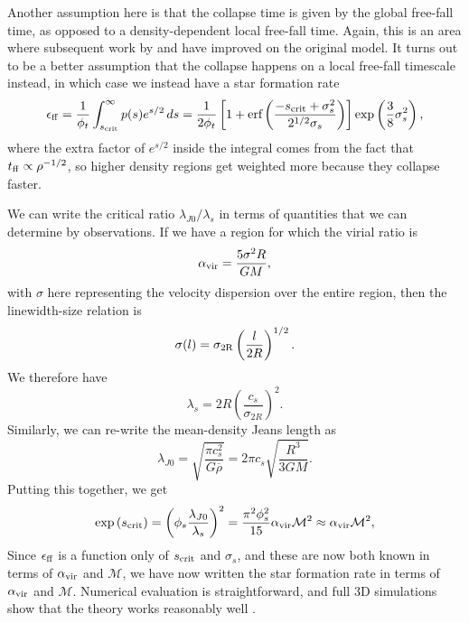 Another assumption here is that the collapse time is given by the global free-fall time, as opposed to a density-dependent local free-fall time. Again, this is an area where subsequent work by \citet{hennebelle11b} and \citet{federrath12a} have improved on the original model. It turns out to be a better assumption that the collapse happens on a local free-fall timescale instead, in which case we instead have a star formation rate
\begin{equation}
\epsilon_{\rm ff} = \frac{1}{\phi_t} \int_{s_{\rm crit}}^\infty p(s) e^{s/2} \, ds
= \frac{1}{2\phi_t} \left[1+\mbox{erf}\left(\frac{-s_{\rm crit}+\sigma_s^2}{2^{1/2}\sigma_s}\right)\right] \exp\left(\frac{3}{8}\sigma_s^2\right),
\end{equation}
where the extra factor of $e^{s/2}$ inside the integral comes from the fact that $t_{\rm ff} \propto \rho^{-1/2}$, so higher density regions get weighted more because they collapse faster.

We can write the critical ratio $\lambda_{J0}/\lambda_s$ in terms of quantities that we can determine by observations. If we have a region for which the virial ratio is
\begin{equation}
\alpha_{\mathrm{vir}} = \frac{5\sigma^2 R}{GM},
\end{equation}
with $\sigma$ here representing the velocity dispersion over the entire region, then the linewidth-size relation is
\begin{equation}
\sigma(l) = \sigma_{\rm 2R} \left(\frac{l}{2R}\right)^{1/2}.
\end{equation}
We therefore have
\begin{equation}
\lambda_s = 2R \left(\frac{c_s}{\sigma_{2R}}\right)^2.
\end{equation}
Similarly, we can re-write the mean-density Jeans length as
\begin{equation}
\lambda_{J0} = \sqrt{\frac{\pi c_s^2}{G\overline{\rho}}} = 2\pi c_s \sqrt{\frac{R^3}{3 GM}}.
\end{equation}
Putting this together, we get
\begin{equation}
\exp\left(s_{\rm crit}\right) = \left(\phi_s \frac{\lambda_{J0}}{\lambda_s}\right)^2 = \frac{\pi^2 \phi_s^2}{15} \alpha_{\mathrm{vir}} \mathcal{M}^2 \approx \alpha_{\mathrm{vir}} \mathcal{M}^2,
\end{equation}
Since $\epsilon_{\rm ff}$ is a function only of $s_{\rm crit}$ and $\sigma_s$, and these are now both known in terms of $\alpha_{\mathrm{vir}}$ and $\mathcal{M}$, we have now written the star formation rate in terms of $\alpha_{\mathrm{vir}}$ and $\mathcal{M}$. Numerical evaluation is straightforward, and full 3D simulations show that the theory works reasonably well \citep{federrath12a}. 

